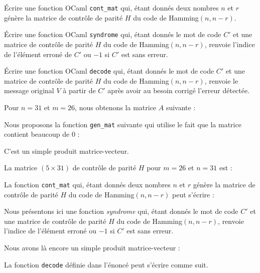 Écrire une fonction OCaml \texttt{cont\_mat} qui, étant donnés deux nombres $n$ et $r$ génère la matrice de contrôle de parité $H$ du code de Hamming$(n,n-r)$.

\Q
Écrire une fonction OCaml \texttt{syndrome} qui, étant donnés le mot de code $C'$ et une matrice de contrôle de parité $H$ du code de Hamming$(n,n-r)$, renvoie l'indice de l'élément erroné de $C'$ ou $-1$ si $C'$ est sans erreur.
\medskip

Écrire une fonction OCaml \texttt{decode} qui, étant donnés le mot de code $C'$ et une matrice de contrôle de parité $H$ du code de Hamming$(n,n-r)$, renvoie le message original $V$ à partir de $C'$ après avoir au besoin corrigé l'erreur détectée.

\Corrige

\Q
Pour $n=31$ et $m=26$, nous obtenons la matrice $A$ suivante :




Nous proposons la fonction \texttt{gen\_mat} suivante qui utilise le fait que la matrice contient beaucoup de 0 :



\Q
C'est un simple produit matrice-vecteur.



\Q
La matrice $(5 \times 31)$ de contrôle de parité $H$ pour $m=26$ et $n=31$ est :


\medskip

La fonction \texttt{cont\_mat} qui, étant donnés deux nombres $n$ et $r$ génère la matrice de contrôle de parité $H$ du code de Hamming$(n,n-r)$ peut s'écrire :



\Q
Nous présentons ici une fonction \textit{syndrome} qui, étant donnés le mot de code $C'$ et une matrice de contrôle de parité $H$ du code de Hamming$(n,n-r)$, renvoie l'indice de l'élément erroné ou $-1$ si $C'$ est sans erreur.
\medskip

Nous avons là encore un simple produit matrice-vecteur :



La fonction \texttt{decode} définie dans l'énoncé peut s'écrire comme suit.



\Fin
